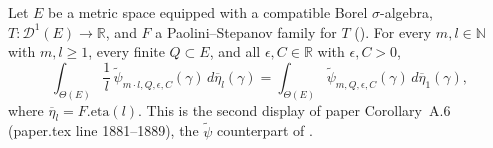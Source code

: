 \begin{corollary}
  Let $E$ be a metric space equipped with a compatible Borel $\sigma$-algebra, $T \colon \mathcal{D}^1(E) \to \mathbb{R}$, and
  $F$ a Paolini--Stepanov family for $T$ (). For every $m,l \in \mathbb{N}$ with
  $m,l \ge 1$, every finite $Q \subset E$, and all $\epsilon, C \in \mathbb{R}$ with $\epsilon,C>0$,
  \[
    \int_{\Theta(E)} \frac{1}{l} \, \tilde\psi_{m\cdot l,Q,\epsilon,C}(\gamma) \,
      d\overline{\eta}_l(\gamma)
    = \int_{\Theta(E)} \tilde\psi_{m,Q,\epsilon,C}(\gamma) \, d\overline{\eta}_1(\gamma)
    ,
  \]
  where $\overline{\eta}_l = F.\mathrm{eta}(l)$. This is the second display of paper
  Corollary~A.6 (paper.tex line 1881--1889), the $\tilde\psi$ counterpart of
  .
\end{corollary}
